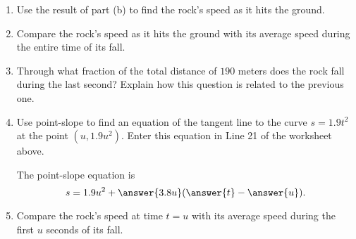 \documentclass{ximera}
\begin{document}
\begin{exploration}
\begin{enumerate}
\begin{enumerate}
\item Use the result of part (b) to find the rock's speed as it hits the ground.

\item Compare the rock's speed as it hits the ground with its average speed during the entire time of its fall.

\item Through what fraction of the total distance of $190$ meters does the rock fall during the last second? Explain how this question is related to the previous one.

\item Use point-slope to find an equation of the tangent line to the curve $s=1.9t^2$ at the point $(u,1.9u^2)$. Enter this equation in Line 21 of the worksheet above.

The point-slope equation is
\[
     s = 1.9u^2 + \answer{3.8u} ( \answer{t} - \answer{u}) .
\]

\item Compare the rock's speed at time $t=u$ with its average speed during the first $u$ seconds of its fall.



\end{enumerate}


\end{enumerate}


\end{exploration}
\end{document}
